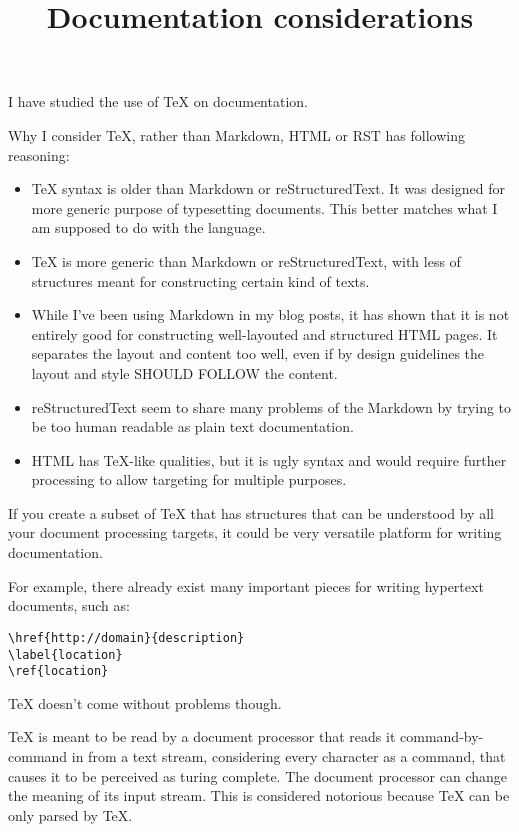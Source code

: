 \documentclass{article}
\begin{document}
\title{Documentation considerations}

I have studied the use of TeX on documentation.



Why I consider TeX, rather than Markdown, HTML or RST has
following reasoning:

\begin{itemize}
\item
    TeX syntax is older than Markdown or reStructuredText.
        It was designed for more generic purpose of
        typesetting documents. This better matches what I am
        supposed to do with the language.
\item
    TeX is more generic than Markdown or reStructuredText,
        with less of structures meant for constructing
        certain kind of texts.
\item
    While I've been using Markdown in my blog posts, it has
        shown that it is not entirely good for constructing
        well-layouted and structured HTML pages. It
        separates the layout and content too well, even if
        by design guidelines the layout and style SHOULD
        FOLLOW the content.
\item
    reStructuredText seem to share many problems of the
        Markdown by trying to be too human readable as plain
        text documentation.
\item
    HTML has TeX-like qualities, but it is ugly syntax and
        would require further processing to allow targeting
        for multiple purposes.
\end{itemize}

If you create a subset of TeX that has structures that can
be understood by all your document processing targets, it
could be very versatile platform for writing documentation.

For example, there already exist many important pieces for
writing hypertext documents, such as:

\begin{verbatim}
\href{http://domain}{description}
\label{location}
\ref{location}
\end{verbatim}

TeX doesn't come without problems though.

TeX is meant to be read by a document processor that reads
it command-by-command in from a text stream, considering
every character as a command, that causes it to be perceived
as turing complete. The document processor can change the
meaning of its input stream. This is considered notorious
because TeX can be only parsed by TeX.
\end{document}
